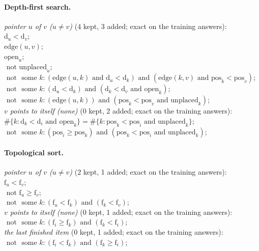 \documentclass[10pt]{article}
\begin{document}
{\paragraph{Depth-first search.}
\emph{pointer $u$ of $v$ ($u \neq v$)} (4 kept, 3 added; exact on the training answers):\\
\quad $\mathrm{d}_{u} < \mathrm{d}_{v}$;\\
\quad $\mathrm{edge}(u, v)$;\\
\quad $\mathrm{open}_{u}$;\\
\quad $\text{ not } \mathrm{unplaced}_{u}$;\\
\quad $\text{ not } \text{ some } k: (\mathrm{edge}(u, k) \text{ and } \mathrm{d}_{u} < \mathrm{d}_{k}) \text{ and } (\mathrm{edge}(k, v) \text{ and } \mathrm{pos}_{k} < \mathrm{pos}_{v})$;\\
\quad $\text{ not } \text{ some } k: (\mathrm{d}_{u} < \mathrm{d}_{k}) \text{ and } (\mathrm{d}_{k} < \mathrm{d}_{v} \text{ and } \mathrm{open}_{k})$;\\
\quad $\text{ not } \text{ some } k: (\mathrm{edge}(u, k)) \text{ and } (\mathrm{pos}_{k} < \mathrm{pos}_{v} \text{ and } \mathrm{unplaced}_{k})$;\\
\emph{$v$ points to itself (none)} (0 kept, 2 added; exact on the training answers):\\
\quad $\#\{k: \mathrm{d}_{k} < \mathrm{d}_{i} \text{ and } \mathrm{open}_{k}\} = \#\{k: \mathrm{pos}_{k} < \mathrm{pos}_{i} \text{ and } \mathrm{unplaced}_{k}\}$;\\
\quad $\text{ not } \text{ some } k: (\mathrm{pos}_{i}  \geq  \mathrm{pos}_{k}) \text{ and } (\mathrm{pos}_{k} < \mathrm{pos}_{i} \text{ and } \mathrm{unplaced}_{k})$;

\paragraph{Topological sort.}
\emph{pointer $u$ of $v$ ($u \neq v$)} (2 kept, 1 added; exact on the training answers):\\
\quad $\mathrm{f}_{u} < \mathrm{f}_{v}$;\\
\quad $\text{ not } \mathrm{f}_{u}  \geq  \mathrm{f}_{v}$;\\
\quad $\text{ not } \text{ some } k: (\mathrm{f}_{u} < \mathrm{f}_{k}) \text{ and } (\mathrm{f}_{k} < \mathrm{f}_{v})$;\\
\emph{$v$ points to itself (none)} (0 kept, 1 added; exact on the training answers):\\
\quad $\text{ not } \text{ some } k: (\mathrm{f}_{i}  \geq  \mathrm{f}_{k}) \text{ and } (\mathrm{f}_{k} < \mathrm{f}_{i})$;\\
\emph{the last finished item} (0 kept, 1 added; exact on the training answers):\\
\quad $\text{ not } \text{ some } k: (\mathrm{f}_{i} < \mathrm{f}_{k}) \text{ and } (\mathrm{f}_{k}  \geq  \mathrm{f}_{i})$;

}
\end{document}
